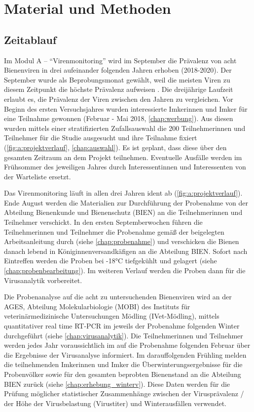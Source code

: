 \section{Material und Methoden}

\subsection{Zeitablauf}

Im Modul A – \enquote{Virenmonitoring} wird im September die Prävalenz von acht Bienenviren in drei aufeinander folgenden Jahren erhoben (2018-2020). Der September wurde als Beprobungsmonat gewählt, weil die meisten Viren zu diesem Zeitpunkt die höchste Prävalenz aufweisen \citep{demiranda2013}. Die dreijährige Laufzeit erlaubt es, die Prävalenz der Viren zwischen den Jahren zu vergleichen.
Vor Beginn des ersten Versuchsjahres wurden interessierte Imkerinnen und Imker für eine Teilnahme gewonnen (Februar - Mai 2018, \cref{chap:werbung}). Aus diesen wurden mittels einer stratifizierten Zufallsauswahl die 200 Teilnehmerinnen und Teilnehmer für die Studie ausgesucht und ihre Teilnahme fixiert (\cref{fig:a:projektverlauf}, \cref{chap:auswahl}). Es ist geplant, dass diese über den gesamten Zeitraum an dem Projekt teilnehmen. Eventuelle Ausfälle werden im Frühsommer des jeweiligen Jahres durch Interessentinnen und Interessenten von der Warteliste ersetzt.

Das Virenmonitoring läuft in allen drei Jahren ident ab (\cref{fig:a:projektverlauf}). Ende August werden die Materialien zur Durchführung der Probenahme von der Abteilung Bienenkunde und Bienenschutz (BIEN) an die Teilnehmerinnen und Teilnehmer verschickt. In den ersten Septemberwochen führen die Teilnehmerinnen und Teilnehmer die Probenahme gemäß der beigelegten Arbeitsanleitung durch (siehe \cref{chap:probenahme}) und verschicken die Bienen danach lebend in Königinnenversandkäfigen an die Abteilung BIEN. Sofort nach Eintreffen werden die Proben bei -18°C tiefgekühlt und gelagert (siehe \cref{chap:probenbearbeitung}). Im weiteren Verlauf werden die Proben dann für die Virusanalytik vorbereitet.

Die Probenanalyse auf die acht zu untersuchenden Bienenviren wird an der AGES, Abteilung Molekularbiologie (MOBI) des Instituts für veterinärmedizinische Untersuchungen Mödling (IVet-Mödling), mittels quantitativer real time RT-PCR im jeweils der Probenahme folgenden Winter durchgeführt (siehe \cref{chap:virusanalytik}). Die Teilnehmerinnen und Teilnehmer werden jedes Jahr voraussichtlich im auf die Probenahme folgenden Februar über die Ergebnisse der Virusanalyse informiert. Im darauffolgenden Frühling melden die teilnehmenden Imkerinnen und Imker die Überwinterungsergebnisse für die Probenvölker sowie für den gesamten beprobten Bienenstand an die Abteilung BIEN zurück (siehe \cref{chap:erhebung_winterv}). Diese Daten werden für die Prüfung möglicher statistischer Zusammenhänge zwischen der Virusprävalenz / der Höhe der Virusbelastung (Virustiter) und Winterausfällen verwendet.

